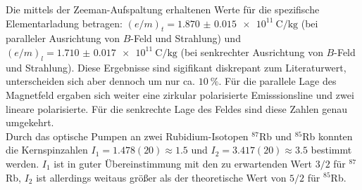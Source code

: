 \documentclass[../main.tex]{subfiles}
\begin{document}
    Die mittels der Zeeman-Aufspaltung erhaltenen Werte für die spezifische Elementarladung betragen: $(e/m)_t=\SI{1.870(15)e11}{\coulomb\per\kilo\gram}$ (bei paralleler Ausrichtung von $B$-Feld und Strahlung) und $(e/m)_l=\SI{1.710(17)e11}{\coulomb\per\kilo\gram}$ (bei senkrechter Ausrichtung von $B$-Feld und Strahlung). Diese Ergebnisse sind sigifikant diskrepant zum Literaturwert, unterscheiden sich aber dennoch um nur ca. $\SI{10}{\percent}$. Für die parallele Lage des Magnetfeld ergaben sich weiter eine zirkular polarisierte Emisssionsline und zwei lineare polarisierte. Für die senkrechte Lage des Feldes sind diese Zahlen genau umgekehrt.\\
    
    \noindent Durch das optische Pumpen an zwei Rubidium-Isotopen $^{87}$Rb und $^{85}$Rb konnten die Kernspinzahlen $I_1=1.478(20)\approx 1.5$ und $I_2=3.417(20)\approx 3.5$ bestimmt werden. $I_1$ ist in guter Übereinstimmung mit den zu erwartenden Wert $3/2$ für $^{87}$Rb, $I_2$ ist allerdings weitaus größer als der theoretische Wert von $5/2$ für $^{85}$Rb.
    
\end{document}
